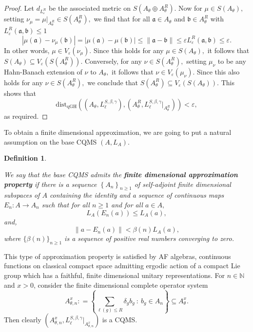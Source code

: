 \documentclass[a4paper,11pt,reqno]{amsart}
\theoremstyle{plain}
\newtheorem{defn}[thm]{Definition}
\theoremstyle{mainthmstyle}
\theoremstyle{named}
\numberwithin{equation}{section}
\begin{document}
\begin{proof}
Let $d_{L_{\varepsilon}^{R}}$ be the associated metric on $S \left (A_{\theta} \oplus A_{\theta}^{R} \right ).$ Now for $\mu \in S \left (A_{\theta} \right ),$ setting $\nu_{\mu} = \mu \rvert_{A_{\theta}^{R}} \in S \left (A_{\theta}^{R} \right ),$ we find that for all $\mathfrak {a} \in A_{\theta}$ and $\mathfrak {b} \in A_{\theta}^{R}$ with $L_{\varepsilon}^{R} (\mathfrak {a}, \mathfrak {b}) \leq 1$
$$\left \lvert \mu (\mathfrak {a}) - \nu_{\mu} (\mathfrak {b}) \right \rvert = \left \lvert \mu (\mathfrak {a}) - \mu (\mathfrak {b}) \right \rvert \leq \|\mathfrak {a} - \mathfrak {b}\| \leq \varepsilon L_{\varepsilon}^{R} (\mathfrak {a}, \mathfrak {b}) \leq \varepsilon.$$ In other words, $\mu \in V_{\varepsilon} (\nu_{\mu}).$ Since this holds for any $\mu \in S \left (A_{\theta} \right ),$ it follows that $S \left (A_{\theta} \right ) \subseteq V_{\varepsilon} \left (S \left (A_{\theta}^{R} \right ) \right ).$ Conversely, for any $\nu \in S \left (A_{\theta}^{R} \right ),$ setting $\mu_{\nu}$ to be any Hahn-Banach extension of $\nu$ to $A_{\theta},$ it follows that $\nu \in V_{\varepsilon} \left (\mu_{\nu} \right ).$ Since this also holds for any $\nu \in S \left (A_{\theta}^{R} \right ),$ we conclude that $S \left (A_{\theta}^{R} \right ) \subseteq V_{\varepsilon} \left ( S \left (A_{\theta} \right ) \right ).$ This shows that
$$\mathrm {dist}_{\mathrm {qGH}} \left (\left (A_{\theta}, L_{\ell}^{S, \beta, \gamma} \right ), \left (A_{\theta}^{R}, L_{\ell}^{S, \beta, \gamma} \big \rvert_{A_{\theta}^{R}} \right ) \right ) < \varepsilon,$$
as required.

\end{proof}

To obtain a finite dimensional approximation, we are going to put a natural assumption on the base CQMS $(A,L_A).$ 

\begin{defn} \label{fdim approx prop}

We say that the base CQMS admits the {\bf finite dimensional approximation property} if there is a sequence $\left \{A_n \right \}_{n \geq 1}$ of self-adjoint finite dimensional subspaces of $A$ containing the identity and a sequence of continuous maps $E_n : A \rightarrow A_n$ such that for all $n \geq 1$ and for all $a \in A,$ $$L_A \left (E_n (a) \right ) \leq L_A (a),$$ and, $$\left \|a - E_n (a) \right \| < \beta (n) L_A (a),$$ where $\{\beta (n)\}_{n \geq 1}$ is a sequence of positive real numbers converging to zero.\end{defn} 
This type of approximation property is satisfied by AF algebras, continuous functions on classical compact space admitting ergodic action of a compact Lie group which has a faithful, finite dimensional unitary representations. For $n\in\mathbb{N}$ and $x>0$, consider the finite dimensional complete operator system \begin{displaymath}A_{\theta, n}^{x} : = \left \{\sum\limits_{\ell (g) \leq R} \delta_g b_g\ :\ b_g \in A_n \right \} \subseteq A_{\theta}^{x}. \end{displaymath}
Then clearly $\left (A_{\theta,n}^{x},L_{\ell}^{S,\beta,\gamma}\big\vert_{A_{\theta,n}^{x}} \right )$ is a CQMS.
\end{document}
